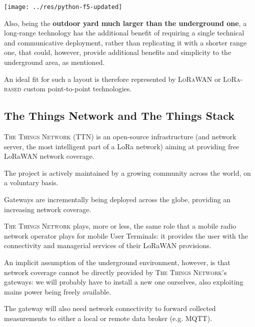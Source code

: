 \documentclass[a4paper,11pt]{article} %
\begin{document}
\begin{center}
    \texttt{[image: ../res/python-f5-updated]}
\end{center}

\smallskip

Also, being the \textbf{outdoor yard much larger than the underground one}, a long-range technology has the additional benefit of requiring a single technical and communicative deployment, rather than replicating it with a shorter range one, that could, however, provide additional benefits and simplicity to the underground area, as mentioned.

\smallskip

An ideal fit for such a layout is therefore represented by \textsc{LoRaWAN} or \textsc{LoRa-based} custom point-to-point technologies.

\subsection{The Things Network and The Things Stack}\label{ttn}

\textsc{The Things Network} (TTN) is an open-source infrastructure (and network server, the most intelligent part of a LoRa network) aiming at providing free LoRaWAN network coverage.

\smallskip

The project is actively maintained by a growing community across the world, on a voluntary basis.

\smallskip

Gateways are incrementally being deployed across the globe, providing an increasing network coverage.

\medskip

\textsc{The Things Network} plays, more or less, the same role that a mobile radio network operator plays for mobile User Terminals: it provides the user with the connectivity and managerial services of their LoRaWAN provisions.

\medskip

An implicit assumption of the underground environment, however, is that network coverage cannot be directly provided by \textsc{The Things Network}'s gateways: we will probably have to install a new one ourselves, also exploiting mains power being freely available.

\medskip

The gateway will also need network connectivity to forward collected measurements to either a local or remote data broker (e.g. MQTT).
\end{document}
